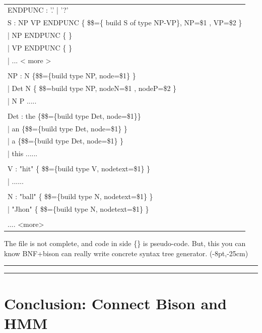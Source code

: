 \setlength{\parwidth}{\linewidth}%
\addtolength{\parwidth}{-1.5\parindent}%
\begin{flushright} \tt
\begin{longtable}{|m{\parwidth}|}\hline

ENDPUNC : '.' | '?'  \\

S : NP VP ENDPUNC \{ \$\$=\{ build S of type NP-VP\}, NP=\$1 , VP=\$2   \}\\
	\qquad	| NP ENDPUNC \{  \}\\
	\qquad	| VP ENDPUNC  \{  \}\\
	\qquad	| ...  < more >  \\ 
\\
NP : N \{\$\$=\{build type NP, node=\$1\} \} \\
\qquad	| Det N \{ \$\$={build type NP, nodeN=\$1 , nodeP=\$2} \} \\
\qquad	| N P ..... \\ 
\\
Det : the  \{\$\$=\{build type Det, node=\$1\}\} \\
\qquad	| an  \{\$\$=\{build type Det, node=\$1\} \} \\
\qquad	| a \{\$\$=\{build type Det, node=\$1\} \} \\
\qquad	| this ...... \\
\\
V : "hit"  \{ \$\$=\{build type V, nodetext=\$1\} \} \\
\qquad	| ...... \\
\\
N : "ball" \{ \$\$=\{build type N, nodetext=\$1\} \} \\
\qquad	| "Jhon" \{ \$\$=\{build type N, nodetext=\$1\} \}  \\
\\
.... <more> \\
\end{longtable}
\end{flushright}

The file is not complete, and code in side \{\} is pseudo-code. But, this you can know BNF+bison 
can really write concrete syntax tree generator. 
\thisfancyput(-8pt,-25cm){
\rule{.5pt}{25cm}
\hspace*{\textwidth}
\rule{.5pt}{25cm}
}

\section{Conclusion: Connect Bison and HMM}

